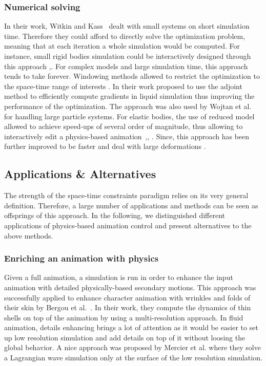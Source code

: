 \subsubsection{Numerical solving}
In their work, Witkin and Kass~\cite{Witkin1988} dealt with small systems on short simulation time. Therefore they could afford to directly solve the optimization problem, meaning that at each iteration a whole simulation would be computed. For instance, small rigid bodies simulation could be interactively designed through this approach \cite{Popovic2000},\cite{Popovic2003}. For complex models and large simulation time, this approach tends to take forever. Windowing methods allowed to restrict the optimization to the space-time range of interests \cite{Cohen1992}. In their work \cite{McNamara2004} proposed to use the adjoint method to efficiently compute gradients in liquid simulation thus improving the performance of the optimization. The approach was also used by Wojtan et al.~\cite{wojtan2006keyframe} for handling large particle systems. For elastic bodies, the use of reduced model allowed to achieve speed-ups of several order of magnitude, thus allowing to interactively edit a physics-based animation~\cite{Barbic2012},\cite{Hildebrandt2012}, \cite{Hahn2012}. Since, this approach has been further improved to be faster \cite{Schulz2014} and deal with large deformations \cite{Li2014}.

\subsection{Applications \& Alternatives}
The strength of the space-time constraints paradigm relies on its very general definition. Therefore, a large number of applications and methods can be seen as offsprings of this approach. In the following, we distinguished different applications of physics-based animation control and present alternatives to the above methods.

\subsubsection{Enriching an animation with physics}
Given a full animation, a simulation is run in order to enhance the input animation with detailed physically-based secondary motions. This approach was successfully applied to enhance character animation with wrinkles and folds of their skin by Bergou et al.~\cite{Bergou2007}. In their work, they compute the dynamics of thin shells on top of the animation by using a multi-resolution approach. In fluid animation, details enhancing brings a lot of attention as it would be easier to set up low resolution simulation and add details on top of it without loosing the global behavior. A nice approach was proposed by Mercier et al. \cite{Mercier2015} where they solve a Lagrangian wave simulation only at the surface of the low resolution simulation.

